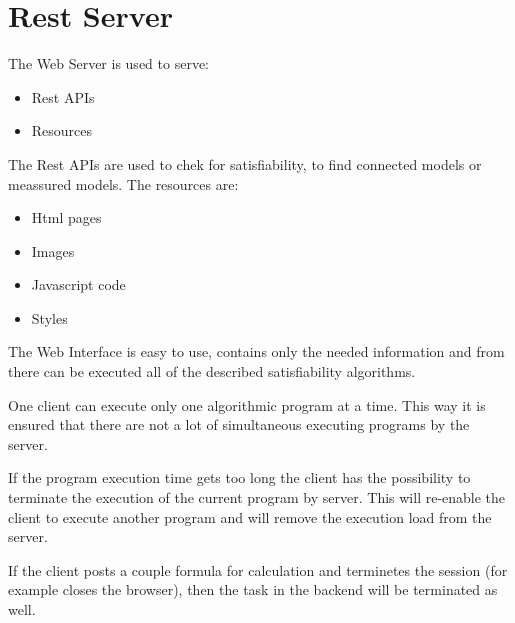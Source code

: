 \documentclass{article}
\begin{document}
\newpage
	\section{Rest Server}
		The Web Server is used to serve:
		\begin{itemize}
			\item Rest APIs
			\item Resources
		\end{itemize}
		The Rest APIs are used to chek for satisfiability, to find connected models or meassured models.
		\newline
		The resources are:
		\begin{itemize}
			\item Html pages
			\item Images 
			\item Javascript code
			\item Styles
		\end{itemize}
		The Web Interface is easy to use, contains only the needed information and from there 
		can be executed all of the described satisfiability algorithms.

		One client can execute only one algorithmic program at a time. 
		This way it is ensured that there are not a lot of simultaneous executing programs by the server.
		
		If the program execution time gets too long the client has the possibility to terminate the execution 
		of the current program by server. This will re-enable the client to execute another program and will remove 
		the execution load from the server.

		If the client posts a couple formula for calculation and terminetes the session (for example closes the browser),
		then the task in the backend will be terminated as well.
\end{document}
